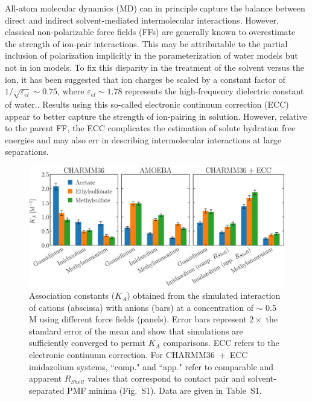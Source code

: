 \documentclass[journal=jpclcd,manuscript=article,articletitle=true,layout=twocolumn]{achemso}
\begin{document}
All-atom molecular dynamics (MD) can in principle capture the balance between direct and indirect solvent-mediated intermolecular interactions.  However, classical non-polarizable force fields (FFs) are generally known to overestimate the strength of ion-pair interactions.\cite{Debiec2014, Debiec2016, Mason2019a} This may be attributable to the partial inclusion of polarization implicitly in the parameterization of water models but not in ion models.\cite{Dijon2020} To fix this disparity in the treatment of the solvent versus the ion, it has been suggested that ion charges be scaled by a constant factor of $1/\sqrt{\varepsilon_{el}} \sim 0.75$, where $\varepsilon_{el} \sim 1.78$ represents the high-frequency dielectric constant of water.\cite{Leontyev2011, Dijon2020}. Results using this so-called  electronic continuum correction (ECC) appear to better capture the strength of ion-pairing in solution. However, relative to the parent FF, the ECC complicates the estimation of solute hydration free energies \cite{Dijon2020} and may also err in describing intermolecular interactions at large separations.\cite{McDaniel2018} 
 
  \begin{figure}[ht!]
    \begin{center}
        \includegraphics[width=\textwidth]{final_images/Figure2.eps}
        \caption{Association constants ($K_A$) obtained from the simulated interaction of cations (abscissa) with anions (bars) at a concentration of $\sim$ 0.5 M using different force fields (panels). Error bars represent $2\times$ the standard error of the mean and show that simulations are sufficiently converged to permit $K_A$ comparisons. ECC refers to the electronic continuum correction. For CHARMM36~+~ECC imidazolium systems, ``comp." and ``app." refer to comparable and apparent $R_{Shell}$ values that correspond to contact pair and solvent-separated PMF minima (Fig.~S1). Data are given in Table~S1.} 
        \label{fig:Ka_bar_plot}
    \end{center}
\end{figure}	 
\end{document}
